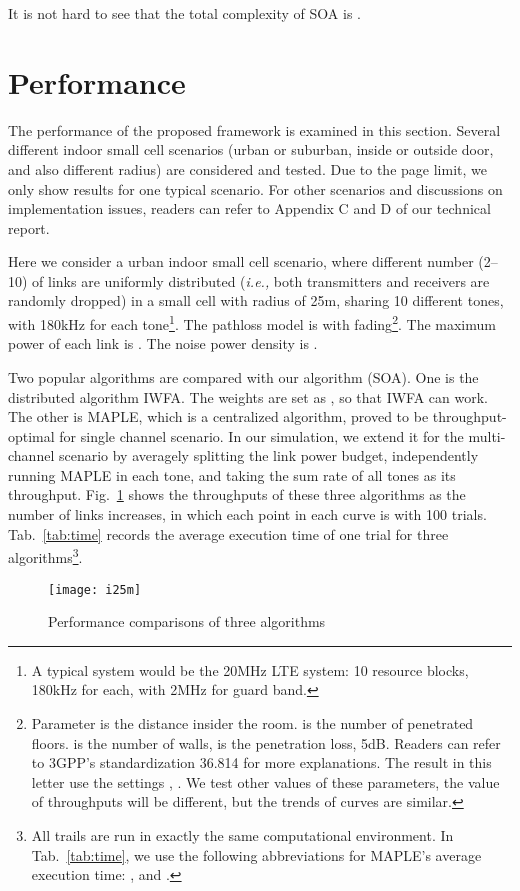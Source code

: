 \documentclass[conference]{IEEEtran}
\newcommand{\ie}{\emph{i.e., }}
\begin{document}
It is not hard to see that the total complexity of SOA is .



\section{Performance}
\label{sec:performance}
The performance of the proposed framework is examined in this section. Several different indoor small cell scenarios (urban or suburban, inside or outside door, and also different radius) are considered and tested. Due to the page limit, we only show results for one typical scenario. For other scenarios and discussions on implementation issues, readers can refer to Appendix C and D of our technical report.

Here we consider a urban indoor small cell scenario, where different number (2--10) of links are uniformly distributed (\ie both transmitters and receivers are randomly dropped) in a small cell with radius of 25m, sharing 10 different tones, with 180kHz for each tone\footnote{A typical system would be the 20MHz LTE system: 10 resource blocks, 180kHz for each, with 2MHz for guard band.}. The pathloss model is  with  fading\footnote{Parameter  is the distance insider the room.  is the number of penetrated floors.  is the number of walls,  is the penetration loss, 5dB. Readers can refer to 3GPP's standardization 36.814 for more explanations. The result in this letter use the settings  , . We test other values of these parameters, the value of throughputs will be different, but the trends of curves are similar.}. The maximum power of each link is .
The noise power density is . 

Two popular algorithms are compared with our algorithm (SOA). One is the  distributed algorithm IWFA. The weights are set as  , so that IWFA can work. The other is MAPLE\cite{qian2009maple}, which is a centralized algorithm, proved to be throughput-optimal for single channel scenario. In our simulation, we extend it for the multi-channel scenario by averagely splitting the link power budget, independently running MAPLE in each tone, and taking the sum rate of all tones as its throughput. Fig.~\ref{fig:simulation} shows the throughputs of these three algorithms as the number of links increases, in which each point in each curve is with 100 trials. Tab.~\ref{tab:time} records the average execution time of one trial for three algorithms\footnote{All trails are run in exactly the same computational environment. In Tab.~\ref{tab:time}, we use the following abbreviations for MAPLE's average execution time: ,  and .}.
\begin{figure}[htb]
\centering
\texttt{[image: i25m]}
\caption{Performance comparisons of three algorithms}
\label{fig:simulation}
\end{figure}
\end{document}
